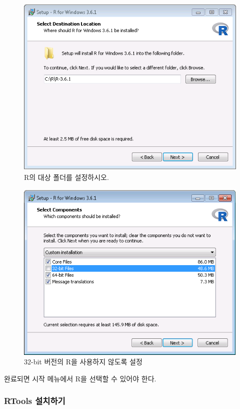 \documentclass[11pt]{book}
\theoremstyle{definition}
\theoremstyle{definition}
\theoremstyle{definition}
\theoremstyle{remark}
\begin{document}
\begin{figure}

{\centering \includegraphics[width=0.8\linewidth]{images/OhdsiAnalyticsTools/rDestination} 

}

\caption{R의 대상 폴더를 설정하시오.}\label{fig:rDestination}
\end{figure}

\begin{figure}

{\centering \includegraphics[width=0.8\linewidth]{images/OhdsiAnalyticsTools/no32Bits} 

}

\caption{32-bit 버전의 R을 사용하지 않도록 설정}\label{fig:no32Bits}
\end{figure}

완료되면 시작 메뉴에서 R을 선택할 수 있어야 한다.

\subsubsection*{RTools 설치하기}\label{rtools-}
\end{document}
